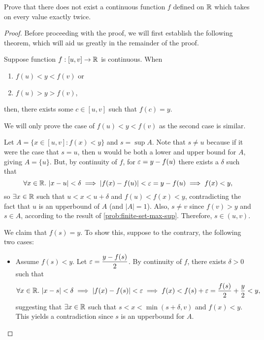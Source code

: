 \begin{problem}
  Prove that there does not exist a continuous function $f$ defined on $\mathbb{R}$ which takes on every value exactly twice.

  \begin{proof}
    Before proceeding with the proof, we will first establish the following
    theorem, which will aid us greatly in the remainder of the proof.

    \begin{theorem}
      \label{thm:intermediate-value-theorem}
      Suppose function $f : [u, v] \to \mathbb{R}$ is continuous. When 
      \begin{enumerate}[label=(\alph*)]
        \item $f(u) < y < f(v)$ or
        \item $f(u) > y > f(v)$,
      \end{enumerate}
      then, there exists some $c \in [u, v]$ such that $f(c) = y$.
    \end{theorem}

    \begin{subproof}
      We will only prove the case of $f(u) < y < f(v)$ as the second case is similar.

      Let $A = \{ x \in [u,v] : f(x) < y \}$ and $s = \sup{A}$.
      Note that $s \neq u$ because if it were the case that $s = u$, then $u$ would be both a lower and upper bound for $A$,
      giving $A = \{ u \}$. But, by continuity of $f$, for $\varepsilon = y - f(u)$ there exists a $\delta$
      such that
      \[
        \forall x \in \mathbb{R}.\, \left\lvert x - u \right\rvert < \delta \implies \left\lvert f(x) - f(u) \right\rvert < \varepsilon = y - f(u) \implies f(x) < y,
      \]
      so $\exists x \in \mathbb{R}$ such that $u < x < u + \delta$ and $f(u) < f(x) < y$, contradicting the fact that $u$
      is an upperbound of $A$ (and $|A| = 1$).
      Also, $s \neq v$ since $f(v) > y$ and $s \in A$, according to the result
      of \ref{prob:finite-set-max-sup}. 
      Therefore, $s \in (u, v)$.

      We claim that $f(s) = y$. To show this, suppose to the contrary, the following two cases:
      \begin{itemize}
        \item Assume $f(s) < y$. Let $\varepsilon = \dfrac{y - f(s)}{2}$. By continuity of $f$, there exists $\delta > 0$ 
          such that
          \[
            \forall x \in \mathbb{R}.\, \left\lvert x - s \right\rvert < \delta \implies \left\lvert f(x) - f(s) \right\rvert < \varepsilon \implies f(x) < f(s) + \varepsilon = \frac{f(s)}{2} + \frac{y}{2} < y,
          \]
          suggesting that $\exists x \in \mathbb{R}$ such that $s < x < \min{(s + \delta, v)}$ and $f(x) < y$.
          This yields a contradiction since $s$ is an upperbound for $A$.


\end{itemize}
\end{subproof}
\end{proof}
\end{problem}
